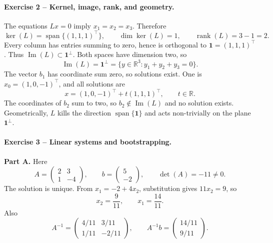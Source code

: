\documentclass[10pt]{article}
\newcommand{\R}{\mathbb{R}}
\newcommand{\rank}{\operatorname{rank}}
\newcommand{\im}{\operatorname{Im}}
\newcommand{\Span}{\operatorname{span}}
\begin{document}
\paragraph{Exercise 2 -- Kernel, image, rank, and geometry.}

The equations $Lx=0$ imply $x_1=x_2=x_3$. Therefore
\[
\ker(L)=\Span\{(1,1,1)^\top\},\qquad \dim\ker(L)=1,
\qquad \rank(L)=3-1=2.
\]
Every column has entries summing to zero, hence is orthogonal to
$\mathbf 1=(1,1,1)^\top$. Thus $\im(L)\subset\mathbf1^\perp$. Both spaces have
dimension two, so
\[
\im(L)=\mathbf1^\perp
=\{y\in\R^3:y_1+y_2+y_3=0\}.
\]
The vector $b_1$ has coordinate sum zero, so solutions exist. One is
$x_0=(1,0,-1)^\top$, and all solutions are
\[
x=(1,0,-1)^\top+t(1,1,1)^\top,\qquad t\in\R.
\]
The coordinates of $b_2$ sum to two, so $b_2\notin\im(L)$ and no solution
exists. Geometrically, $L$ kills the direction $\Span\{\mathbf1\}$ and acts
non-trivially on the plane $\mathbf1^\perp$.

\paragraph{Exercise 3 -- Linear systems and bootstrapping.}

\textbf{Part A.} Here
\[
A=\begin{pmatrix}2&3\\1&-4\end{pmatrix},\qquad
b=\begin{pmatrix}5\\-2\end{pmatrix},\qquad \det(A)=-11\neq0.
\]
The solution is unique. From $x_1=-2+4x_2$, substitution gives
$11x_2=9$, so
\[
x_2=\frac9{11},\qquad x_1=\frac{14}{11}.
\]
Also
\[
A^{-1}=\begin{pmatrix}4/11&3/11\\1/11&-2/11\end{pmatrix},
\qquad A^{-1}b=\begin{pmatrix}14/11\\9/11\end{pmatrix}.
\]
\end{document}
